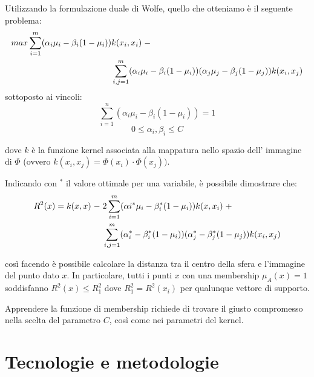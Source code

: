 \documentclass[a4paper,12pt]{report}
\begin{document}
Utilizzando la formulazione duale di Wolfe, quello che otteniamo è il seguente problema:
\begin{equation*}
\begin{split}
    max \displaystyle\sum_{i=1}^{m}(\alpha_i\mu_i - \beta_i(1-\mu_i))&k(x_i,x_i)\hspace{0,1cm}- \\ &\displaystyle\sum_{i,j=1}^{m}(\alpha_i\mu_i - \beta_i(1-\mu_i))(\alpha_j\mu_j - \beta_j(1-\mu_j))k(x_i,x_j)
\end{split}
\end{equation*}
sottoposto ai vincoli:
\begin{equation}
    \displaystyle\sum_{i=1}^{n}(\alpha_i\mu_i - \beta_i(1-\mu_i)) = 1
\end{equation}
\begin{equation}
    0 \le \alpha_i,\beta_i \le C
\end{equation}

dove $k$ è la funzione kernel associata alla mappatura nello spazio dell' immagine di $\Phi$ (ovvero $k(x_i,x_j) = \Phi(x_i)\cdot\Phi(x_j))$.

Indicando con $^*$ il valore ottimale per una variabile, è possibile dimostrare che:
\begin{equation*}
\begin{split}
    R^{2}(x) = k(x,x) \hspace{0,1cm}- \hspace{0,1cm}&2\displaystyle\sum_{i=1}^{m}(\alpha{i}^{*}\mu_{i} - \beta_{i}^{*}(1-\mu_{i}))k(x,x_i)\hspace{0,1cm} + \\ 
    &\displaystyle\sum_{i,j=1}^{m}(\alpha_{i}^{*} - \beta_{i}^{*}(1-\mu_{i}))(\alpha_{j}^{*} - \beta_{j}^{*}(1-\mu_{j}))k(x_i,x_j)
\end{split}
\end{equation*}

così facendo è possibile calcolare la distanza tra il centro della sfera e l'immagine del punto dato $x$.
In particolare, tutti i punti $x$ con una membership $\mu_{A}(x) = 1$ soddisfanno $R^2(x) \le R^2_1$ dove $R^2_1 = R^2(x_i)$ per qualunque vettore di supporto.

Apprendere la funzione di membership richiede di trovare il giusto compromesso nella scelta del parametro $C$, così come nei parametri del kernel.




%
%
\chapter{Tecnologie e metodologie}
\label{Capitolo 2}
\end{document}
